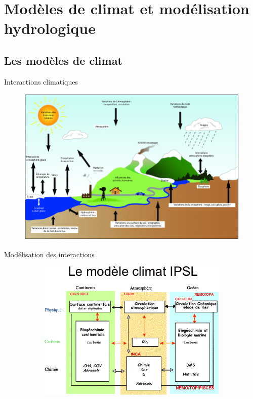 \documentclass{beamer}
\numberwithin{equation}{section}
\begin{document}
	\section{Modèles de climat et modélisation hydrologique}	
	\subsection{Les modèles de climat}
	\begin{frame}
	\begin{block}{Interactions climatiques}
	\begin{figure}[H]
		\begin{center}
			\includegraphics[scale=0.18]{images/interaction_climat.png}
		\end{center}
	\end{figure} 
	\end{block}
	\begin{block}{Modélisation des interactions}
		\begin{figure}
		\begin{center}
			\begin{subfigure}[b]{0.45\textwidth}
				\includegraphics[scale=0.19]{images/modele_climat_IPSL.png}

\end{subfigure}
\end{center}
\end{figure}
\end{block}
\end{frame}
\end{document}
